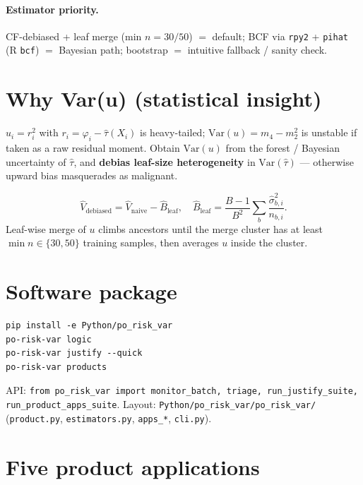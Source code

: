 \documentclass[11pt]{article}
\begin{document}
\paragraph{Estimator priority.}
CF-debiased + leaf merge (min $n{=}30/50$) $=$ default;
BCF via \texttt{rpy2} + \texttt{pihat} (R \texttt{bcf}) $=$ Bayesian path;
bootstrap $=$ intuitive fallback / sanity check.

\section{Why Var(u) (statistical insight)}

$u_i=r_i^2$ with $r_i=\varphi_i-\hat\tau(X_i)$ is heavy-tailed;
$\mathrm{Var}(u)=m_4-m_2^2$ is unstable if taken as a raw residual moment.
Obtain $\mathrm{Var}(u)$ from the forest / Bayesian uncertainty of
$\hat\tau$, and \textbf{debias leaf-size heterogeneity} in
$\mathrm{Var}(\hat\tau)$ --- otherwise upward bias masquerades as malignant.

\[
\widehat V_{\mathrm{debiased}}
=\widehat V_{\mathrm{naive}}-\widehat B_{\mathrm{leaf}},
\quad
\widehat B_{\mathrm{leaf}}
=\frac{B-1}{B^2}\sum_b\frac{\hat\sigma^2_{b,i}}{n_{b,i}}.
\]
Leaf-wise merge of $u$ climbs ancestors until the merge cluster has at least
$\min n\in\{30,50\}$ training samples, then averages $u$ inside the cluster.

\section{Software package}

\begin{verbatim}
pip install -e Python/po_risk_var
po-risk-var logic
po-risk-var justify --quick
po-risk-var products
\end{verbatim}

\noindent
API: \texttt{from po\_risk\_var import monitor\_batch, triage,
run\_justify\_suite, run\_product\_apps\_suite}.
Layout: \texttt{Python/po\_risk\_var/po\_risk\_var/}
(\texttt{product.py}, \texttt{estimators.py}, \texttt{apps\_*}, \texttt{cli.py}).

\section{Five product applications}
\end{document}
